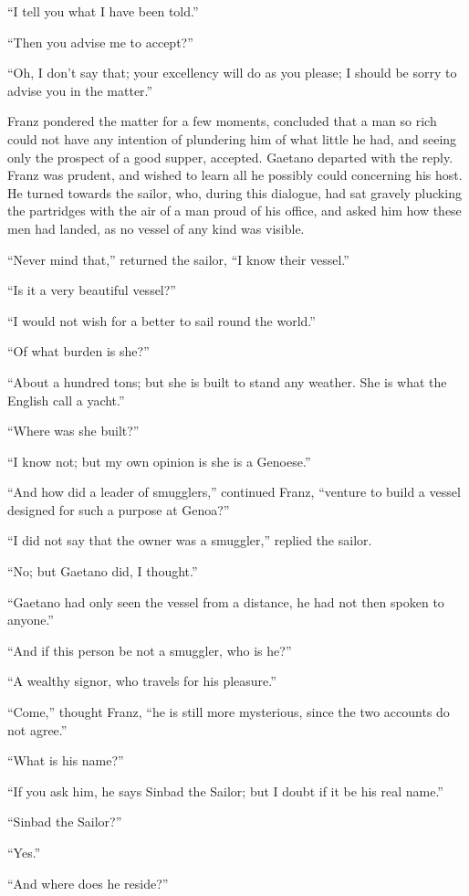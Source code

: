 “I tell you what I have been told.”

“Then you advise me to accept?”

“Oh, I don’t say that; your excellency will do as you please; I should
be sorry to advise you in the matter.”

Franz pondered the matter for a few moments, concluded that a man so
rich could not have any intention of plundering him of what little he
had, and seeing only the prospect of a good supper, accepted. Gaetano
departed with the reply. Franz was prudent, and wished to learn all he
possibly could concerning his host. He turned towards the sailor, who,
during this dialogue, had sat gravely plucking the partridges with the
air of a man proud of his office, and asked him how these men had
landed, as no vessel of any kind was visible.

“Never mind that,” returned the sailor, “I know their vessel.”

“Is it a very beautiful vessel?”

“I would not wish for a better to sail round the world.”

“Of what burden is she?”

“About a hundred tons; but she is built to stand any weather. She is
what the English call a yacht.”

“Where was she built?”

“I know not; but my own opinion is she is a Genoese.”

“And how did a leader of smugglers,” continued Franz, “venture to build
a vessel designed for such a purpose at Genoa?”

“I did not say that the owner was a smuggler,” replied the sailor.

“No; but Gaetano did, I thought.”

“Gaetano had only seen the vessel from a distance, he had not then
spoken to anyone.”

“And if this person be not a smuggler, who is he?”

“A wealthy signor, who travels for his pleasure.”

“Come,” thought Franz, “he is still more mysterious, since the two
accounts do not agree.”

“What is his name?”

“If you ask him, he says Sinbad the Sailor; but I doubt if it be his
real name.”

“Sinbad the Sailor?”

“Yes.”

“And where does he reside?”


